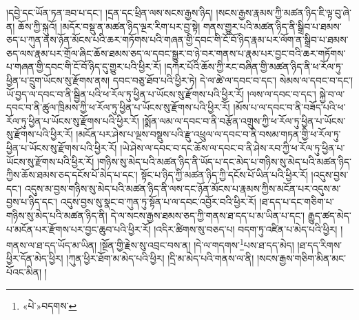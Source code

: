།དབྱེ་དང་ཡོན་ཏན་ཟབ་པ་དང་། །དྲན་དང་ཕྲིན་ལས་སངས་རྒྱས་ཉིད། །སངས་རྒྱས་རྣམས་ཀྱི་མཚན་ཉིད་ཇི་ལྟ་བུ་ཞེ་ན། ཆོས་ཀྱི་སྐུའོ། །མདོར་བསྡུ་ན་མཚན་ཉིད་ལྔར་རིག་པར་བྱ་སྟེ། གནས་གྱུར་པའི་མཚན་ཉིད་ནི་སྒྲིབ་པ་ཐམས་ཅད་པ་ཀུན་ནས་ཉོན་མོངས་པའི་ཆར་གཏོགས་པའི་གཞན་གྱི་དབང་གི་ངོ་བོ་ཉིད་རྣམ་པར་ལོག་ན་སྒྲིབ་པ་ཐམས་ཅད་ལས་རྣམ་པར་གྲོལ་ཞིང་ཆོས་ཐམས་ཅད་ལ་དབང་སྒྱུར་བ་ཉེ་བར་གནས་པ་རྣམ་པར་བྱང་བའི་ཆར་གཏོགས་པ་གཞན་གྱི་དབང་གི་ངོ་བོ་ཉིད་དུ་གྱུར་པའི་ཕྱིར་རོ། །དཀར་པོའི་ཆོས་ཀྱི་རང་བཞིན་གྱི་མཚན་ཉིད་ནི་ཕ་རོལ་ཏུ་ཕྱིན་པ་དྲུག་ཡོངས་སུ་རྫོགས་ནས། དབང་བཅུ་ཐོབ་པའི་ཕྱིར་ཏེ། དེ་ལ་ཚེ་ལ་དབང་བ་དང་། སེམས་ལ་དབང་བ་དང་། ཡོ་བྱད་ལ་དབང་བ་ནི་སྦྱིན་པའི་ཕ་རོལ་ཏུ་ཕྱིན་པ་ཡོངས་སུ་རྫོགས་པའི་ཕྱིར་རོ། །ལས་ལ་དབང་བ་དང་། སྐྱེ་བ་ལ་དབང་བ་ནི་ཚུལ་ཁྲིམས་ཀྱི་ཕ་རོལ་ཏུ་ཕྱིན་པ་ཡོངས་སུ་རྫོགས་པའི་ཕྱིར་རོ། །མོས་པ་ལ་དབང་བ་ནི་བཟོད་པའི་ཕ་རོལ་ཏུ་ཕྱིན་པ་ཡོངས་སུ་རྫོགས་པའི་ཕྱིར་རོ། །སྨོན་ལམ་ལ་དབང་བ་ནི་བརྩོན་འགྲུས་ཀྱི་ཕ་རོལ་ཏུ་ཕྱིན་པ་ཡོངས་སུ་རྫོགས་པའི་ཕྱིར་རོ། །མངོན་པར་ཤེས་པ་ལྔས་བསྡུས་པའི་རྫུ་འཕྲུལ་ལ་དབང་བ་ནི་བསམ་གཏན་གྱི་ཕ་རོལ་ཏུ་ཕྱིན་པ་ཡོངས་སུ་རྫོགས་པའི་ཕྱིར་རོ། །ཡེ་ཤེས་ལ་དབང་བ་དང་ཆོས་ལ་དབང་བ་ནི་ཤེས་རབ་ཀྱི་ཕ་རོལ་ཏུ་ཕྱིན་པ་ཡོངས་སུ་རྫོགས་པའི་ཕྱིར་རོ། །གཉིས་སུ་མེད་པའི་མཚན་ཉིད་ནི་ཡོད་པ་དང་མེད་པ་གཉིས་སུ་མེད་པའི་མཚན་ཉིད་ཀྱིས་ཆོས་ཐམས་ཅད་དངོས་པོ་མེད་པ་དང་། སྟོང་པ་ཉིད་ཀྱི་མཚན་ཉིད་ཀྱི་དངོས་པོ་ཡིན་པའི་ཕྱིར་རོ། །འདུས་བྱས་དང་། འདུས་མ་བྱས་གཉིས་སུ་མེད་པའི་མཚན་ཉིད་ནི་ལས་དང་ཉོན་མོངས་པ་རྣམས་ཀྱིས་མངོན་པར་འདུས་མ་བྱས་པ་ཉིད་དང་། འདུས་བྱས་སུ་སྣང་བ་ཀུན་ཏུ་སྟོན་པ་ལ་དབང་འབྱོར་བའི་ཕྱིར་རོ། །ཐ་དད་པ་དང་གཅིག་པ་གཉིས་སུ་མེད་པའི་མཚན་ཉིད་ནི། དེ་ལ་སངས་རྒྱས་ཐམས་ཅད་ཀྱི་གནས་ཐ་དད་པ་མ་ཡིན་པ་དང་། རྒྱུད་ཚད་མེད་པ་མངོན་པར་རྫོགས་པར་བྱང་ཆུབ་པའི་ཕྱིར་རོ། །འདིར་ཚིགས་སུ་བཅད་པ། བདག་ཏུ་འཛིན་པ་མེད་པའི་ཕྱིར། །གནས་ལ་ཐ་དད་ཡོད་མ་ཡིན། །སྔོན་གྱི་རྗེས་སུ་འབྲང་བས་ན། །དེ་ལ་གདགས་\footnote{«པེ་»བདགས་}པས་ཐ་དད་མེད། །ཐ་དད་རིགས་ཕྱིར་དོན་མེད་ཕྱིར། །ཀུན་ཕྱིར་ཐོག་མ་མེད་པའི་ཕྱིར། །དྲི་མ་མེད་པའི་གནས་ལ་ནི། །སངས་རྒྱས་གཅིག་མིན་མང་པོའང་མིན། །
